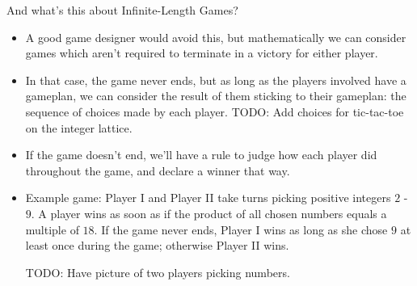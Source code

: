 \documentclass{beamer}
\begin{document}
\begin{frame}{And what's this about Infinite-Length Games?}
  \begin{itemize}
  \item
    A good game designer would avoid this, but mathematically we can consider games which aren't required to terminate in a victory for either player.
  \pause
  \item
    In that case, the game never ends, but as long as the players involved have a gameplan, we can consider the result of them sticking to their gameplan: the sequence of choices made by each player. TODO: Add choices for tic-tac-toe on the integer lattice.
  \pause
  \item
    If the game doesn't end, we'll have a rule to judge how each player did throughout the game, and declare a winner that way.
  \end{itemize}
\end{frame}

\begin{frame}
  \begin{itemize}
  \item 
    Example game: Player I and Player II take turns picking positive integers $2$ - $9$. A player wins as soon as if the product of all chosen numbers equals a multiple of $18$. If the game never ends, Player I wins as long as she chose $9$ at least once during the game; otherwise Player II wins.

    TODO: Have picture of two players picking numbers.
  \end{itemize}
\end{frame}
\end{document}
